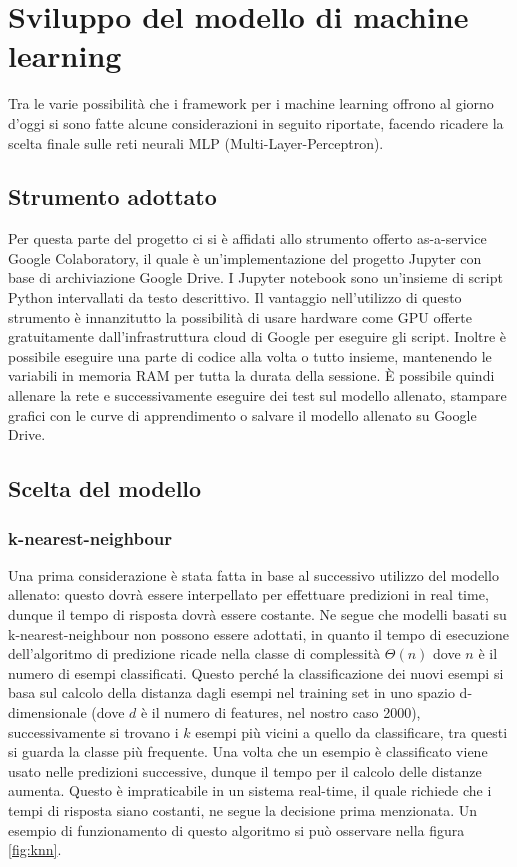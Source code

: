 \section{Sviluppo del modello di machine learning}
Tra le varie possibilità che i framework per i machine learning offrono al giorno d'oggi si sono fatte alcune considerazioni in seguito riportate, facendo ricadere la scelta finale sulle reti neurali MLP (Multi-Layer-Perceptron).

\subsection{Strumento adottato}
Per questa parte del progetto ci si è affidati allo strumento offerto as-a-service Google Colaboratory, il quale è un'implementazione del progetto Jupyter con base di archiviazione Google Drive.
I Jupyter notebook sono un'insieme di script Python intervallati da testo descrittivo.
Il vantaggio nell'utilizzo di questo strumento è innanzitutto la possibilità di usare hardware come GPU offerte gratuitamente dall'infrastruttura cloud di Google per eseguire gli script. Inoltre è possibile eseguire una parte di codice alla volta o tutto insieme, mantenendo le variabili in memoria RAM per tutta la durata della sessione. È possibile quindi allenare la rete e successivamente eseguire dei test sul modello allenato, stampare grafici con le curve di apprendimento o salvare il modello allenato su Google Drive.

\subsection{Scelta del modello}
\subsubsection{k-nearest-neighbour}
Una prima considerazione è stata fatta in base al successivo utilizzo del modello allenato: questo dovrà essere interpellato per effettuare predizioni in real time, dunque il tempo di risposta dovrà essere costante. Ne segue che modelli basati su k-nearest-neighbour non possono essere adottati, in quanto il tempo di esecuzione dell'algoritmo di predizione ricade nella classe di complessità $\Theta (n)$ dove $n$ è il numero di esempi classificati. Questo perché la classificazione dei nuovi esempi si basa sul calcolo della distanza dagli esempi nel training set in uno spazio d-dimensionale (dove $d$ è il numero di features, nel nostro caso 2000), successivamente si trovano i $k$ esempi più vicini a quello da classificare, tra questi si guarda la classe più frequente. Una volta che un esempio è classificato viene usato nelle predizioni successive, dunque il tempo per il calcolo delle distanze aumenta. Questo è impraticabile in un sistema real-time, il quale richiede che i tempi di risposta siano costanti, ne segue la decisione prima menzionata.
Un esempio di funzionamento di questo algoritmo si può osservare nella figura \ref{fig:knn}.


